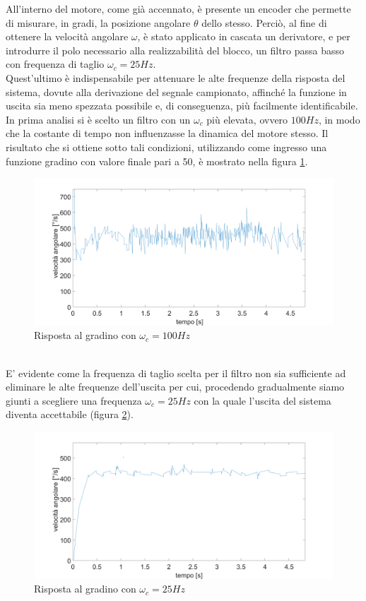All'interno del motore, come già accennato, è presente un encoder che permette di misurare, in gradi, la posizione angolare $\theta$ dello stesso.
Perciò, al fine di ottenere la velocità angolare $\omega$, è stato applicato in cascata un derivatore, e per introdurre il polo necessario alla realizzabilità del blocco, un filtro passa basso con frequenza di taglio $\omega_c=25Hz$. \\Quest'ultimo è indispensabile per attenuare le alte frequenze della risposta del sistema, dovute alla derivazione del segnale campionato, affinché la funzione in uscita sia meno spezzata possibile e, di conseguenza, più facilmente identificabile.\\
In prima analisi si è scelto un filtro con un $\omega_c$ più elevata, ovvero $100Hz$, in modo che la costante di tempo non influenzasse la dinamica del motore stesso.
Il risultato che si ottiene sotto tali condizioni, utilizzando come ingresso una funzione gradino con valore finale pari a 50, è mostrato nella figura \ref{motore50StepCamp1000Polo100}.
\begin{figure}[ht]
	\centering
	\includegraphics[width=\textwidth]{motore50StepCamp1000Polo100.png}
	\caption{Risposta al gradino con $\omega_c=100Hz$ }
	\label{motore50StepCamp1000Polo100}
\end{figure}
\\E' evidente come la frequenza di taglio scelta per il filtro non sia sufficiente ad eliminare le alte frequenze dell'uscita per cui, procedendo gradualmente siamo giunti a  scegliere una frequenza $\omega_c = 25Hz$ con la quale l'uscita del sistema diventa accettabile (figura \ref{motore50StepCamp1000}).
\begin{figure}[ht]
\centering
\includegraphics[width=\textwidth]{motore50StepCamp1000.png}
\caption{Risposta al gradino con $\omega_c=25Hz$}
\label{motore50StepCamp1000}
\end{figure}

